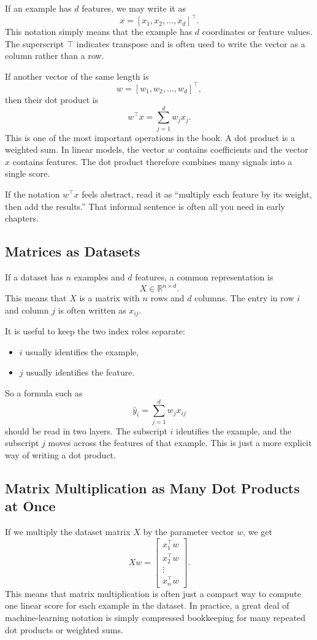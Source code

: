 If an example has $d$ features, we may write it as
\[
x = [x_1, x_2, \ldots, x_d]^\top.
\]
This notation simply means that the example has $d$ coordinates or feature values. The superscript $\top$ indicates transpose and is often used to write the vector as a column rather than a row.

If another vector of the same length is
\[
w = [w_1, w_2, \ldots, w_d]^\top,
\]
then their dot product is
\[
w^\top x = \sum_{j=1}^{d} w_j x_j.
\]
This is one of the most important operations in the book. A dot product is a weighted sum. In linear models, the vector $w$ contains coefficients and the vector $x$ contains features. The dot product therefore combines many signals into a single score.

\begin{prereqbridge}
If the notation $w^\top x$ feels abstract, read it as ``multiply each feature by its weight, then add the results.'' That informal sentence is often all you need in early chapters.
\end{prereqbridge}

\subsection{Matrices as Datasets}

If a dataset has $n$ examples and $d$ features, a common representation is
\[
X \in \mathbb{R}^{n \times d}.
\]
This means that $X$ is a matrix with $n$ rows and $d$ columns. The entry in row $i$ and column $j$ is often written as $x_{ij}$.

It is useful to keep the two index roles separate:
\begin{itemize}[leftmargin=*]
\item $i$ usually identifies the example,
\item $j$ usually identifies the feature.
\end{itemize}

So a formula such as
\[
\hat{y}_i = \sum_{j=1}^{d} w_j x_{ij}
\]
should be read in two layers. The subscript $i$ identifies the example, and the subscript $j$ moves across the features of that example. This is just a more explicit way of writing a dot product.

\subsection{Matrix Multiplication as Many Dot Products at Once}

If we multiply the dataset matrix $X$ by the parameter vector $w$, we get
\[
Xw =
\begin{bmatrix}
x_1^\top w \\
x_2^\top w \\
\vdots \\
x_n^\top w
\end{bmatrix}.
\]
This means that matrix multiplication is often just a compact way to compute one linear score for each example in the dataset. In practice, a great deal of machine-learning notation is simply compressed bookkeeping for many repeated dot products or weighted sums.

